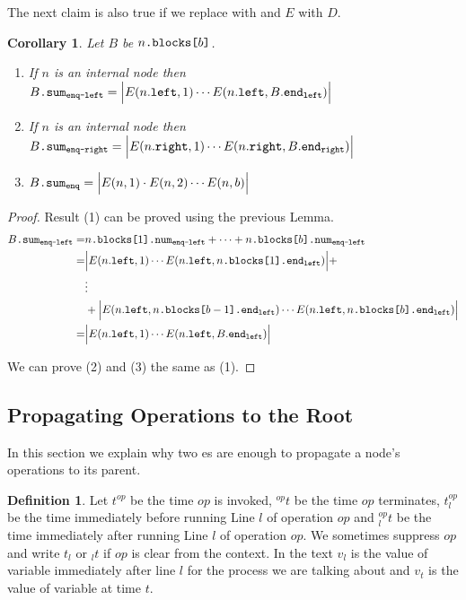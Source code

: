 \documentclass[10pt]{article}
\newcommand{\sub}[1]{\textsubscript{#1}}
\newcommand{\nf}[1]{{\normalfont{\texttt{#1}}}}
\newtheorem{corollary}[theorem]{Corollary}
\theoremstyle{definition}
\newtheorem{definition}[theorem]{Definition}
\begin{document}
The next claim is also true if we replace \nf{enq} with \nf{deq} and $E$ with $D$.
\begin{corollary}\label{lem::sumX}
Let $B$ be $n\nf{.blocks[}b\nf{]}$.
\begin{enumerate}[label=(\arabic*)]
    \item If $n$ is an internal node then $B\nf{.sum\sub{enq-left}}=\Big|E(n.\nf{left},1)\cdots E(n.\nf{left},B.\nf{end\sub{left}})\Big|$
    \item If $n$ is an internal node then $B\nf{.sum\sub{enq-right}}=\Big|E(n.\nf{right},1)\cdots E(n.\nf{right},B.\nf{end\sub{right}})\Big|$
    \item $B\nf{.sum\sub{enq}}=\Big|E(n,1)\cdot E(n,2)\cdots E(n,b)\Big|$
\end{enumerate}
\end{corollary}
\begin{proof} Result (1) can be proved using the previous Lemma.
\begin{align*}
    B\nf{.sum\sub{enq-left}}=&n\nf{.blocks[}1\nf{].num\sub{enq-left}}+\dots+ n\nf{.blocks[}b\nf{].num\sub{enq-left}}\\
    =& \Big|E(n.\nf{left},1)\cdots E(n.\nf{left},n\nf{.blocks[}1\nf{].end\sub{left}})\Big| +\\
    &\vdots\\
    &+\Big|E(n.\nf{left},n\nf{.blocks[}b-1\nf{].end\sub{left}})\cdots E(n.\nf{left},n\nf{.blocks[}b\nf{].end\sub{left}})\Big|\\
    =&\Big|E(n.\nf{left},1)\cdots E(n.\nf{left},B.\nf{end\sub{left}})\Big|
\end{align*}

We can prove (2) and (3) the same as (1).
\end{proof}


\pagebreak

\subsection{Propagating Operations to the Root}
In this section we explain why two \nf{Refresh}es are enough to propagate a node's operations to its parent.

\begin{definition}
Let $t^{op}$ be the time $op$ is invoked, $^{op}t$ be the time $op$ terminates, $t_{l}^{op}$ be the time immediately before running Line $l$ of operation $op$ and $^{op}_{l}t$ be the time immediately after running Line $l$ of operation $op$. We sometimes suppress $op$ and write $t_{l}$ or $_l t$ if $op$ is clear from the context. In the text $v_l$ is the value of variable \nf{v} immediately after line $l$ for the process we are talking about and $v_t$ is the value of variable \nf{v} at time $t$.
\end{definition} 
\end{document}
